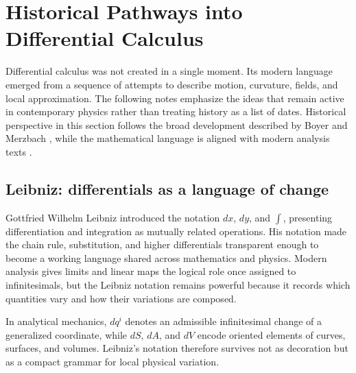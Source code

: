 \section{Historical Pathways into Differential Calculus}
\label{sec:ch2-historical-pathways}

Differential calculus was not created in a single moment.  Its modern language
emerged from a sequence of attempts to describe motion, curvature, fields,
and local approximation.  The following notes emphasize the ideas that remain
active in contemporary physics rather than treating history as a list of dates. Historical perspective in this section follows the broad development described by Boyer and Merzbach \cite{boyer2011history}, while the mathematical language is aligned with modern analysis texts \cite{apostol1967calculus,spivak2008calculus}.

\subsection{Leibniz: differentials as a language of change}
\begin{historicalnote}
Gottfried Wilhelm Leibniz introduced the notation $dx$, $dy$, and
$\int$, presenting differentiation and integration as mutually related
operations.  His notation made the chain rule, substitution, and higher
differentials transparent enough to become a working language shared across
mathematics and physics.  Modern analysis gives limits and linear maps the
logical role once assigned to infinitesimals, but the Leibniz notation remains
powerful because it records which quantities vary and how their variations are
composed.
\end{historicalnote}
\begin{bookinsight}
In analytical mechanics, $dq^i$ denotes an admissible infinitesimal change of
a generalized coordinate, while $dS$, $dA$, and $dV$ encode oriented elements
of curves, surfaces, and volumes.  Leibniz's notation therefore survives not
as decoration but as a compact grammar for local physical variation.
\end{bookinsight}

